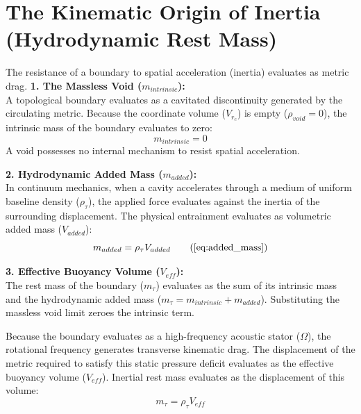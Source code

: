 \vspace{0.2 cm}

\section{The Kinematic Origin of Inertia (Hydrodynamic Rest Mass)}
\label{sec:deriv_hydrodynamic_mass}

The resistance of a boundary to spatial acceleration (inertia) evaluates as metric drag.  
\textbf{1. The Massless Void ($m_{intrinsic}$):} \\
A topological boundary evaluates as a cavitated discontinuity generated by the circulating metric. Because the coordinate volume ($V_{r_c}$) is empty ($\rho_{void} = 0$), the intrinsic mass of the boundary evaluates to zero: 
\begin{equation}
    m_{intrinsic} = 0 \label{eq:intrinsic_mass}
\end{equation}
A void possesses no internal mechanism to resist spatial acceleration.

\textbf{2. Hydrodynamic Added Mass ($m_{added}$):} \\
In continuum mechanics, when a cavity accelerates through a medium of uniform baseline density ($\rho_{\tau}$), the applied force evaluates against the inertia of the surrounding displacement. The physical entrainment evaluates as volumetric added mass ($V_{added}$): 
\begin{equation}
    m_{added} = \rho_{\tau} V_{added} \tag{\ref{eq:added_mass}}
\end{equation}

\textbf{3. Effective Buoyancy Volume ($V_{eff}$):} \\
The rest mass of the boundary ($m_\tau$) evaluates as the sum of its intrinsic mass and the hydrodynamic added mass ($m_\tau = m_{intrinsic} + m_{added}$). Substituting the massless void limit zeroes the intrinsic term. 

Because the boundary evaluates as a high-frequency acoustic stator ($\Omega$), the rotational frequency generates transverse kinematic drag. The displacement of the metric required to satisfy this static pressure deficit evaluates as the effective buoyancy volume ($V_{eff}$). Inertial rest mass evaluates as the displacement of this volume: 
\begin{equation}
    m_\tau = \rho_{\tau} V_{eff} \label{eq:kinematic_mass}
\end{equation}

